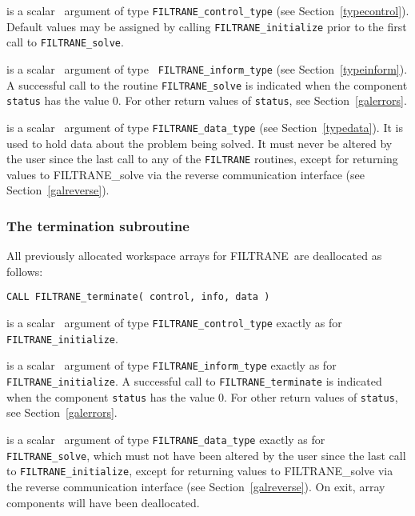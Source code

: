 \documentclass{galahad}
\newcommand{\packagename}{FILTRANE}
\begin{document}
\begin{description}
 is a scalar \intentin\ argument of type
{\tt \packagename\_control\_type}
(see Section~\ref{typecontrol}). Default values may be assigned by calling
{\tt \packagename\_initialize} prior to the first call to
{\tt \packagename\_solve}.

 is a scalar \intentout\ argument of type {\tt
\packagename\_inform\_type}
(see Section~\ref{typeinform}). A successful call to the routine
{\tt \packagename\_solve}
is indicated when the  component {\tt status} has the value 0.
For other return values of {\tt status}, see Section~\ref{galerrors}.

 is a scalar \intentinout\ argument of type
{\tt \packagename\_data\_type}
(see Section~\ref{typedata}). It is used to hold data about the problem being
solved. It must never be  altered by the user since the last call to
any of the {\tt \packagename} routines, except for returning values to
\packagename\_solve via the reverse communication interface (see
Section~\ref{galreverse}).

\end{description}


\subsubsection{The  termination subroutine}
All previously allocated workspace arrays for \packagename\ are deallocated as
follows:
\vspace*{1mm}

\hspace{8mm}
{\tt CALL \packagename\_terminate( control, info, data )}

\begin{description}
 is a scalar \intentin\ argument of type
{\tt \packagename\_control\_type}
exactly as for
{\tt \packagename\_initialize}.

 is a scalar \intentout\ argument of type
{\tt \packagename\_inform\_type}
exactly as for
{\tt \packagename\_initialize}.
A successful call to {\tt \packagename\_terminate}
is indicated when the component {\tt status} has the value 0.
For other return values of {\tt status}, see Section~\ref{galerrors}.

 is a scalar \intentinout\ argument of type
{\tt \packagename\_data\_type}
exactly as for
{\tt \packagename\_solve},
which must not have been altered by the user since the last call to
{\tt \packagename\_initialize}, except for returning values to
\packagename\_solve via the reverse communication interface (see
Section~\ref{galreverse}).
On exit, array components will have been deallocated.
\end{description}
\end{document}
